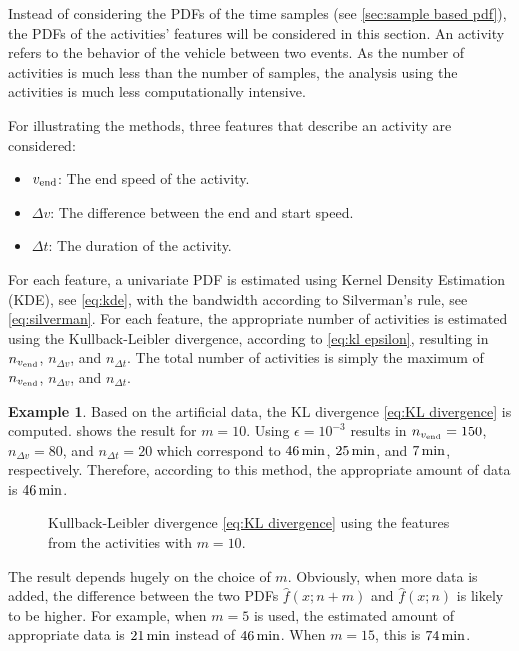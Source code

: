 \documentclass[10pt,final,a4paper,oneside,onecolumn]{article}
\newlength\figurewidth
\newlength\figureheight
\theoremstyle{plain}\newtheorem{definition}{Definition}[section]    %
\theoremstyle{definition}\newtheorem{example}{Example}[section]     %
\theoremstyle{remark}\newtheorem{remarkenv}{Remark}[section]        %
\begin{document}
Instead of considering the PDFs of the time samples (see \cref{sec:sample based pdf}), the PDFs of the activities' features will be considered in this section. 
An activity refers to the behavior of the vehicle between two events. As the number of activities is much less than the number of samples, the analysis using the activities is much less computationally intensive.

For illustrating the methods, three features that describe an activity are considered:
\begin{itemize}
	\item $v_{\textup{end}}$: The end speed of the activity.
	\item $\Delta v$: The difference between the end and start speed.
	\item $\Delta t$: The duration of the activity.
\end{itemize}

For each feature, a univariate PDF is estimated using Kernel Density Estimation (KDE), see \cref{eq:kde}, with the bandwidth according to Silverman's rule, see \cref{eq:silverman}. For each feature, the appropriate number of activities is estimated using the Kullback-Leibler divergence, according to \cref{eq:kl epsilon}, resulting in $n_{v_{\textup{end}}}$, $n_{\Delta v}$, and $n_{\Delta t}$. The total number of activities is simply the maximum of $n_{v_{\textup{end}}}$, $n_{\Delta v}$, and $n_{\Delta t}$.

\begin{example}
	Based on the artificial data, the KL divergence \cref{eq:KL divergence} is computed.  shows the result for $m=10$. Using $\epsilon = 10^{-3}$ results in $n_{v_{\textup{end}}}=150$, $n_{\Delta v}=80$, and $n_{\Delta t}=20$ which correspond to $\unit[46]{min}$, $\unit[25]{min}$, and $\unit[7]{min}$, respectively. Therefore, according to this method, the appropriate amount of data is $\unit[46]{min}$. 
	
	\setlength{}
	\setlength\figureheight{0.7\figurewidth}
	\begin{figure}
		\centering
		\caption{Kullback-Leibler divergence \cref{eq:KL divergence} using the features from the activities with $m=10$.}
		\label{fig:kl activity based}
	\end{figure}

	The result depends hugely on the choice of $m$. Obviously, when more data is added, the difference between the two PDFs $\hat{f}(x;n+m)$ and $\hat{f}(x;n)$ is likely to be higher. For example, when $m=5$ is used, the estimated amount of appropriate data is $\unit[21]{min}$ instead of $\unit[46]{min}$. When $m=15$, this is $\unit[74]{min}$.
\end{example}
\end{document}
